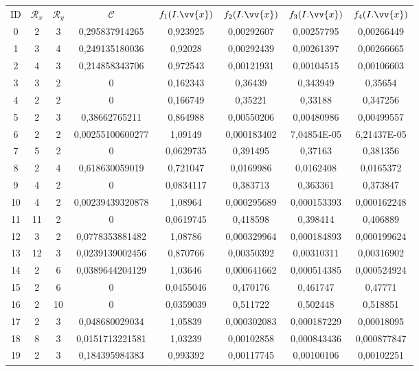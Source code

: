 \scriptsize
\begin{longtable}{|c|c|c|c|c|c|c|c|}
\hline
ID & $\mathscr{R}_x$ & $\mathscr{R}_y$ & $\mathscr{C}$ & $f_1(I.\vv{x})$ & $f_2(I.\vv{x})$ & $f_3(I.\vv{x})$ & $f_4(I.\vv{x})$ \\
0 & 2 & 3 & 0,295837914265 & 0,923925 & 0,00292607 & 0,00257795 & 0,00266449  \\
1 & 3 & 4 & 0,249135180036 & 0,92028 & 0,00292439 & 0,00261397 & 0,00266665  \\
2 & 4 & 3 & 0,214858343706 & 0,972543 & 0,00121931 & 0,00104515 & 0,00106603  \\
3 & 3 & 2 & 0 & 0,162343 & 0,36439 & 0,343949 & 0,35654  \\
4 & 2 & 2 & 0 & 0,166749 & 0,35221 & 0,33188 & 0,347256  \\
5 & 2 & 3 & 0,38662765211 & 0,864988 & 0,00550206 & 0,00480986 & 0,00499557  \\
6 & 2 & 2 & 0,00255100600277 & 1,09149 & 0,000183402 & 7,04854E-05 & 6,21437E-05  \\
7 & 5 & 2 & 0 & 0,0629735 & 0,391495 & 0,37163 & 0,381356  \\
8 & 2 & 4 & 0,618630059019 & 0,721047 & 0,0169986 & 0,0162408 & 0,0165372  \\
9 & 4 & 2 & 0 & 0,0834117 & 0,383713 & 0,363361 & 0,373847  \\
10 & 4 & 2 & 0,00239439320878 & 1,08964 & 0,000295689 & 0,000153393 & 0,000162248  \\
11 & 11 & 2 & 0 & 0,0619745 & 0,418598 & 0,398414 & 0,406889  \\
12 & 3 & 2 & 0,0778353881482 & 1,08786 & 0,000329964 & 0,000184893 & 0,000199624  \\
13 & 12 & 3 & 0,0239139002456 & 0,870766 & 0,00350392 & 0,00310311 & 0,00316902  \\
14 & 2 & 6 & 0,0389644204129 & 1,03646 & 0,000641662 & 0,000514385 & 0,000524924  \\
15 & 2 & 6 & 0 & 0,0455046 & 0,470176 & 0,461747 & 0,47771  \\
16 & 2 & 10 & 0 & 0,0359039 & 0,511722 & 0,502448 & 0,518851  \\
17 & 2 & 3 & 0,048680029034 & 1,05839 & 0,000302083 & 0,000187229 & 0,00018095  \\
18 & 8 & 3 & 0,0151713221581 & 1,03239 & 0,00102858 & 0,000843436 & 0,000877847  \\
19 & 2 & 3 & 0,184395984383 & 0,993392 & 0,00117745 & 0,00100106 & 0,00102251  \\

\end{longtable}

